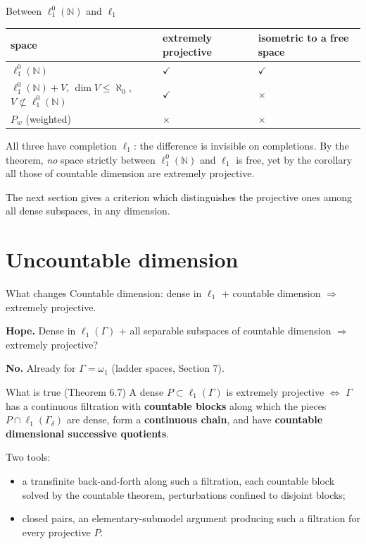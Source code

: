 \documentclass[10pt,aspectratio=169]{beamer}
\newcommand{\lo}[1]{\ell_1^0(#1)}
\newcommand{\ellone}[1]{\ell_1(#1)}
\newcommand{\NN}{\mathbb N}
\newcommand{\yes}{\textcolor{good}{$\checkmark$}}
\newcommand{\no}{\textcolor{accent}{$\boldsymbol\times$}}
\begin{document}
\begin{frame}{Between $\lo\NN$ and $\ell_1$}
  \begin{center}
    \begin{tabular}{@{}lll@{}}
      \toprule
      space & extremely projective & isometric to a free space\\
      \midrule
      $\lo\NN$ & \yes & \yes\\
      $\lo\NN+V$, $\dim V\le\aleph_0$, $V\not\subset\lo\NN$ & \yes & \no\\
      $P_w$ (weighted) & \no & \no\\
      \bottomrule
    \end{tabular}
  \end{center}
  \medskip
  All three have completion $\ell_1$: the difference is invisible on
  completions. By the theorem, \emph{no} space strictly between $\lo\NN$ and
  $\ell_1$ is free, yet by the corollary all those of countable dimension are
  extremely projective.
  \medskip

  The next section gives a criterion which distinguishes the projective ones
  among all dense subspaces, in any dimension.
\end{frame}

\section{Uncountable dimension}

\begin{frame}{What changes}
  Countable dimension: dense in $\ell_1$ $+$ countable dimension
  $\Rightarrow$ extremely projective.
  \medskip

  \textbf{Hope.} Dense in $\ellone\Gamma$ $+$ all separable subspaces of countable
  dimension $\Rightarrow$ extremely projective?
  \medskip

  \textbf{No.} Already for $\Gamma=\omega_1$ (ladder spaces, Section 7).
  \begin{block}{What is true (Theorem 6.7)}
    A dense $P\subset\ellone\Gamma$ is extremely projective $\iff$ $\Gamma$ has a
    continuous filtration with \textbf{countable blocks} along which the pieces
    $P\cap\ellone{\Gamma_\delta}$ are dense, form a \textbf{continuous chain},
    and have \textbf{countable dimensional successive quotients}.
  \end{block}
  \medskip
  Two tools:
  \begin{itemize}
    \item a transfinite back-and-forth along such a filtration, each countable
      block solved by the countable theorem, perturbations confined to
      disjoint blocks;
    \item closed pairs, an elementary-submodel argument producing such a
      filtration for every projective $P$.
  \end{itemize}
\end{frame}
\end{document}
